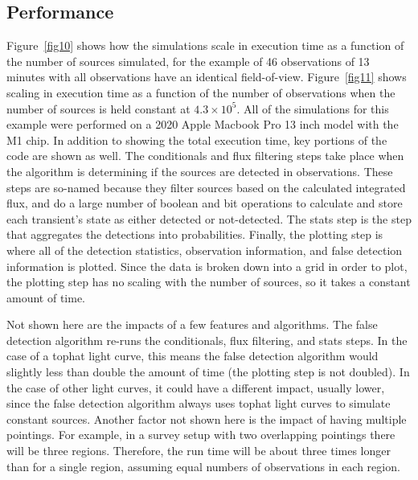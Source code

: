 \documentclass[12pt]{article}
\begin{document}
\subsection{Performance}\label{performance}
Figure~\ref{fig10} shows how the simulations scale in execution time as a function of the number of sources simulated, for the example of 46 observations of 13 minutes with all observations have an identical field-of-view. Figure~\ref{fig11} shows scaling in execution time as a function of the number of observations when the number of sources is held constant at $4.3\times10^{5}$.  All of the simulations for this example were performed on a 2020 Apple Macbook Pro 13 inch model with the M1 chip. In addition to showing the total execution time, key portions of the code are shown as well. The conditionals and flux filtering steps take place when the algorithm is determining if the sources are detected in observations. These steps are so-named because they filter sources based on the calculated integrated flux, and do a large number of boolean and bit operations to calculate and store each transient's state as either detected or not-detected. The stats step is the step that aggregates the detections into probabilities. Finally, the plotting step is where all of the detection statistics, observation information, and false detection information is plotted. Since the data is broken down into a grid in order to plot, the plotting step has no scaling with the number of sources, so it takes a constant amount of time. 

Not shown here are the impacts of a few features and algorithms. The false detection algorithm re-runs the conditionals, flux filtering, and stats steps. In the case of a tophat light curve, this means the false detection algorithm would slightly less than double the amount of time (the plotting step is not doubled). In the case of other light curves, it could have a different impact, usually lower, since the false detection algorithm always uses tophat light curves to simulate constant sources. Another factor not shown here is the impact of having multiple pointings. For example, in a survey setup with two overlapping pointings there will be three regions. Therefore, the run time will be about three times longer than for a single region, assuming equal numbers of observations in each region. 
\end{document}
